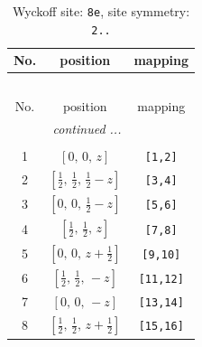 \documentclass[fleqn,8pt]{jsarticle}
\begin{document}
\renewcommand{\arraystretch}{1.2}
\begin{longtable}{ccc}
\caption{Wyckoff site: {\tt 8e}, site symmetry: {\tt 2..}}
 \\
 \hline \hline
No. & position & mapping \\ \hline \endfirsthead

\multicolumn{2}{l}{\tablename\ \thetable{}} \\
 \hline \hline
No. & position & mapping \\ \hline \endhead

 \hline \hline
\multicolumn{2}{r}{\footnotesize\it continued ...} \\ \endfoot

 \hline \hline
\multicolumn{2}{r}{} \\ \endlastfoot

1 & $\left[ 0,\, 0,\, z \right]$ & {\tt [1,2]} \\ \hline
2 & $\left[ \frac{1}{2},\, \frac{1}{2},\, \frac{1}{2} - z \right]$ & {\tt [3,4]} \\ \hline
3 & $\left[ 0,\, 0,\, \frac{1}{2} - z \right]$ & {\tt [5,6]} \\ \hline
4 & $\left[ \frac{1}{2},\, \frac{1}{2},\, z \right]$ & {\tt [7,8]} \\ \hline
5 & $\left[ 0,\, 0,\, z + \frac{1}{2} \right]$ & {\tt [9,10]} \\ \hline
6 & $\left[ \frac{1}{2},\, \frac{1}{2},\, - z \right]$ & {\tt [11,12]} \\ \hline
7 & $\left[ 0,\, 0,\, - z \right]$ & {\tt [13,14]} \\ \hline
8 & $\left[ \frac{1}{2},\, \frac{1}{2},\, z + \frac{1}{2} \right]$ & {\tt [15,16]} \\
\end{longtable}
\renewcommand{\arraystretch}{1.2}
\end{document}
